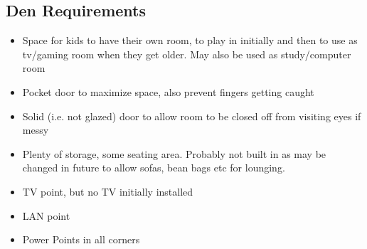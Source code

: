 \subsection{Den Requirements}
\begin{itemize}
\item Space for kids to have their own room, to play in initially and then to use as tv/gaming room when they get older. May also be used as study/computer room

\item Pocket door to maximize space, also prevent fingers getting caught
\item Solid (i.e. not glazed) door to allow room to be closed off from visiting eyes if messy
\item Plenty of storage, some seating area. Probably not built in as may be changed in future to allow sofas, bean bags etc for lounging.
\item TV point, but no TV initially installed
\item LAN point
\item Power Points in all corners

\end{itemize}
